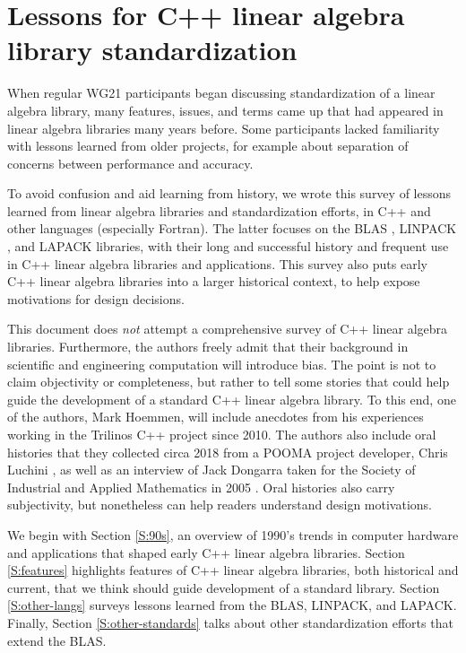 \chapter{Lessons for C++ linear algebra library standardization}

When regular WG21 participants began discussing standardization of a
linear algebra library, many features, issues, and terms came up that
had appeared in linear algebra libraries many years before.  Some
participants lacked familiarity with lessons learned from older
projects, for example about separation of concerns between performance
and accuracy.

To avoid confusion and aid learning from history, we wrote this survey
of lessons learned from linear algebra libraries and standardization
efforts, in C++ and other languages (especially Fortran).  The latter
focuses on the BLAS \cite{BLAS-standard}, LINPACK
\cite{dongarra1979linpack}, and LAPACK \cite{LAPACK-Users-Guide}
libraries, with their long and successful history and frequent use in
C++ linear algebra libraries and applications.  This survey also puts
early C++ linear algebra libraries into a larger historical context,
to help expose motivations for design decisions.

This document does \emph{not} attempt a comprehensive survey of C++
linear algebra libraries.  Furthermore, the authors freely admit that
their background in scientific and engineering computation will
introduce bias.  The point is not to claim objectivity or
completeness, but rather to tell some stories that could help guide
the development of a standard C++ linear algebra library.  To this
end, one of the authors, Mark Hoemmen, will include anecdotes from his
experiences working in the Trilinos C++ project
\cite{heroux2005trilinos} since 2010.  The authors also include oral
histories that they collected circa 2018 from a POOMA project
developer, Chris Luchini \cite{hoemmen2018history}, as well as an
interview of Jack Dongarra taken for the Society of Industrial and
Applied Mathematics in 2005 \cite{dongarra2005history}.  Oral
histories also carry subjectivity, but nonetheless can help readers
understand design motivations.

We begin with Section \ref{S:90s}, an overview of 1990's trends in
computer hardware and applications that shaped early C++ linear
algebra libraries.  Section \ref{S:features} highlights features of
C++ linear algebra libraries, both historical and current, that we
think should guide development of a standard library.  Section
\ref{S:other-langs} surveys lessons learned from the BLAS, LINPACK,
and LAPACK.  Finally, Section \ref{S:other-standards} talks about
other standardization efforts that extend the BLAS.

